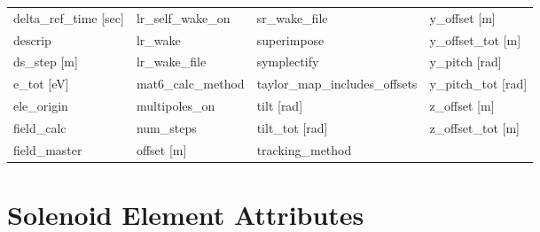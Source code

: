 \begin{tabular}{llll}
delta_ref_time [sec]             & lr_self_wake_on                  & sr_wake_file                     & y_offset [m]                     \\
descrip                          & lr_wake                          & superimpose                      & y_offset_tot [m]                 \\
ds_step [m]                      & lr_wake_file                     & symplectify                      & y_pitch [rad]                    \\
e_tot [eV]                       & mat6_calc_method                 & taylor_map_includes_offsets      & y_pitch_tot [rad]                \\
ele_origin                       & multipoles_on                    & tilt [rad]                       & z_offset [m]                     \\
field_calc                       & num_steps                        & tilt_tot [rad]                   & z_offset_tot [m]                 \\
field_master                     & offset [m]                       & tracking_method                  &                                  \\
 \bottomrule
 \end{tabular}
 \vfill
 
 \section{Solenoid Element Attributes}
 \label{s:list.solenoid}
 
